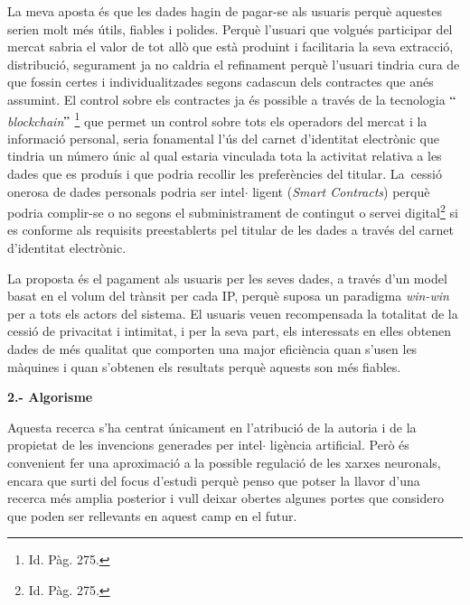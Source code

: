 \documentclass[12pt]{article}
\begin{document}
\vspace{\baselineskip}
\begin{justify}
La meva aposta és que les dades hagin de pagar-se als usuaris perquè aquestes serien molt més útils, fiables i polides. Perquè l’usuari que volgués participar del mercat sabria el valor de tot allò que està produint i facilitaria la seva extracció, distribució, segurament ja no caldria el refinament perquè l’usuari tindria cura de que fossin certes i individualitzades segons cadascun dels contractes que anés assumint.  El control sobre els contractes ja és possible a través de la tecnologia $``$\textit{blockchain}$"$ \footnote{ Id. Pàg. 275. } que permet un control sobre tots els operadors del mercat i la informació personal, seria fonamental l’ús del carnet d’identitat electrònic que tindria un número únic al qual estaria vinculada tota la activitat relativa a les dades que es produís i que podria recollir les preferències del titular. La\  cessió onerosa de dades personals podria ser intel$ \cdot $ ligent (\textit{Smart Contracts}) perquè podria complir-se o no segons el subministrament de contingut o servei digital\footnote{ Id. Pàg. 275. } si es conforme als requisits preestablerts pel titular de les dades a través del carnet d’identitat electrònic. 
\end{justify}\par

\begin{justify}
La proposta és el pagament als usuaris per les seves dades, a través d’un model basat en el volum del trànsit per cada IP, perquè suposa un paradigma \textit{win-win} per a tots els actors del sistema. El usuaris veuen recompensada la totalitat de la cessió de privacitat i intimitat, i per la seva part, els interessats en elles obtenen dades de més qualitat que comporten una major eficiència quan s’usen les màquines i quan s’obtenen els resultats perquè aquests son més fiables. 
\end{justify}\par


\vspace{\baselineskip}
\textbf{2.- Algorisme}\par


\vspace{\baselineskip}
\begin{justify}
Aquesta recerca s’ha centrat únicament en l’atribució de la autoria i de la propietat de les invencions generades per intel$ \cdot $ ligència artificial. Però és convenient fer una aproximació a la possible regulació de les xarxes neuronals, encara que surti del focus d’estudi perquè penso que potser la llavor d’una recerca més amplia posterior i vull deixar obertes algunes portes que considero que poden ser rellevants en aquest camp en el futur. 
\end{justify}\par
\end{document}
